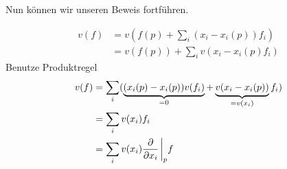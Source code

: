 Nun können wir unseren Beweis fortführen.

\begin{bew} \leavevmode
\begin{align*}
v(f) &= v(f(p) + \sum_i (x_i - x_i(p)) f_i) \\
&= v(f(p)) + \sum_i v(x_i - x_i (p) f_i)
\end{align*}
Benutze Produktregel
\begin{align*}
v(f) &= \sum_i (\underbrace{(x_i (p) - x_i (p)) v(f_i)}_{=0} + \underbrace{v(x_i - x_i (p))}_{=v(x_i)} f_i) \\
&= \sum_i v(x_i) f_i \\
&= \sum_i v(x_i) \pdv{x_i} \eval_p f 
\end{align*}
\end{bew}

